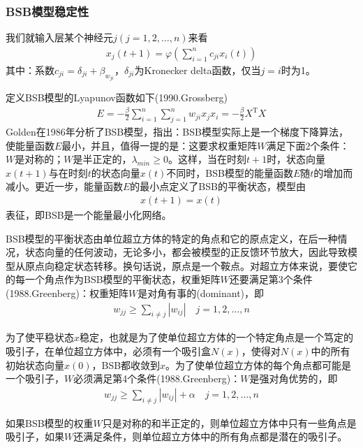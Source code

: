 {        \subsubsection{BSB模型稳定性}
            \par
            我们就输入层某个神经元$j(j=1,2,\dots,n)$来看
            \begin{align*}
            x_j(t+1) = \varphi \left( \sum_{i=1}^n c_{ji}x_i(t) \right)
            \end{align*}
            其中：系数$c_{ji} = \delta_{ji}+\beta_{w_{ji}}$，$\delta_{ji}$为Kronecker delta函数，仅当$j=i$时为1。
            \par
            定义BSB模型的Lyapunov函数如下(1990.Grossberg)
            \begin{align*}
            E = -\frac{\beta}{2} \sum_{i=1}^n\sum_{j=1}^n w_{ji}x_jx_i = -\frac{\beta}{2} X^\mathrm{T} X
            \end{align*}
            Golden在1986年分析了BSB模型，指出：BSB模型实际上是一个梯度下降算法，使能量函数$E$最小，并且，值得一提的是：这要求权重矩阵$W$满足下面2个条件：$W$是对称的；$W$是半正定的，$\lambda_{min} \geqslant 0$。这样，当在时刻$t+1$时，状态向量$x(t+1)$与在时刻$t$的状态向量$x(t)$不同时，BSB模型的能量函数$E$随$t$的增加而减小。更近一步，能量函数$E$的最小点定义了BSB的平衡状态，模型由
            \begin{align*}
            x(t+1) = x(t)
            \end{align*}
            表征，即BSB是一个能量最小化网络。
            \par
            BSB模型的平衡状态由单位超立方体的特定的角点和它的原点定义，在后一种情况，状态向量的任何波动，无论多小，都会被模型的正反馈环节放大，因此导致模型从原点向稳定状态转移。换句话说，原点是一个鞍点。对超立方体来说，要使它的每一个角点作为BSB模型的平衡状态，权重矩阵$W$还要满足第3个条件(1988.Greenberg)：权重矩阵$W$是对角有事的(dominant)，即
            \begin{align*}
            w_{jj} \geqslant \sum_{i \neq j}|w_{ij}| \quad j= 1,2,\dots,n
            \end{align*}
            \par
            为了使平稳状态$x$稳定，也就是为了使单位超立方体的一个特定角点是一个笃定的吸引子，在单位超立方体中，必须有一个吸引盒$N(x)$，使得对$N(x)$中的所有初始状态向量$x(0)$，BSB都收敛到$x$。为了使单位超立方体的每个角点都可能是一个吸引子，$W$必须满足第4个条件(1988.Greenberg)：$W$是强对角优势的，即
            \begin{align*}
            w_{jj} \geqslant \sum_{i \neq j}|w_{ij}|+\alpha \quad j= 1,2,\dots,n
            \end{align*}
            \par
            如果BSB模型的权重$W$只是对称的和半正定的，则单位超立方体中只有一些角点是吸引子，如果$W$还满足条件，则单位超立方体中的所有角点都是潜在的吸引子。

}

